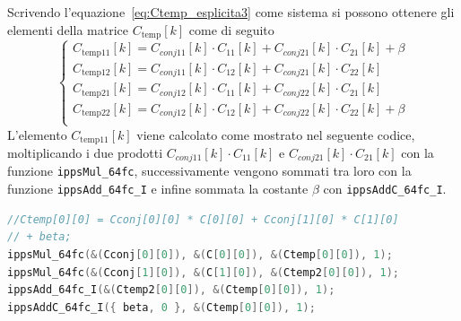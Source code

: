 \documentclass[12pt,a4paper,titlepage]{article}
\begin{document}
Scrivendo l'equazione~\eqref{eq:Ctemp_esplicita3} come sistema si possono ottenere gli elementi della matrice $C_{\text{temp}}[k]$ come di seguito
\begin{equation}\label{eq:sistema_ctemp}
\begin{cases}
C_{\text{temp11}}[k] = C_{conj11}[k] \cdot C_{11}[k] + C_{conj21}[k] \cdot C_{21}[k] + \beta\\
C_{\text{temp12}}[k] = C_{conj11}[k] \cdot C_{12}[k] + C_{conj21}[k] \cdot C_{22}[k]\\
C_{\text{temp21}}[k] = C_{conj12}[k] \cdot C_{11}[k] + C_{conj22}[k] \cdot C_{21}[k]\\
C_{\text{temp22}}[k] = C_{conj12}[k] \cdot C_{12}[k] + C_{conj22}[k] \cdot C_{22}[k] + \beta\\
\end{cases}
\end{equation}
L'elemento $C_{\text{temp11}}[k]$ viene calcolato come mostrato nel seguente codice, moltiplicando i due prodotti $C_{conj11}[k] \cdot C_{11}[k]$ e $C_{conj21}[k] \cdot C_{21}[k]$ con la funzione \texttt{ippsMul\_64fc}, successivamente vengono sommati tra loro con la funzione \texttt{ippsAdd\_64fc\_I} e infine sommata la costante $\beta$ con \texttt{ippsAddC\_64fc\_I}.
\begin{lstlisting}[language=cpp, label=code:ctemp_11, caption = Implementazione della prima riga del sistema~\eqref{eq:sistema_ctemp}, breaklines = false, captionpos = b]
//Ctemp[0][0] = Cconj[0][0] * C[0][0] + Cconj[1][0] * C[1][0]
// + beta;
ippsMul_64fc(&(Cconj[0][0]), &(C[0][0]), &(Ctemp[0][0]), 1);
ippsMul_64fc(&(Cconj[1][0]), &(C[1][0]), &(Ctemp2[0][0]), 1);
ippsAdd_64fc_I(&(Ctemp2[0][0]), &(Ctemp[0][0]), 1);
ippsAddC_64fc_I({ beta, 0 }, &(Ctemp[0][0]), 1);
\end{lstlisting}
\end{document}
